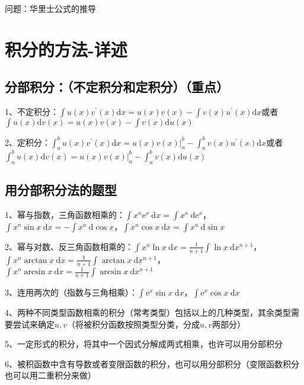 问题：华里士公式的推导

\section{积分的方法-详述}



\subsection{分部积分：（不定积分和定积分）（重点）}

1、不定积分：$\int u(x) v^{\prime}(x) \mathrm{d} x=u(x) v(x)-\int v(x) u^{\prime}(x) \mathrm{d} x$或者$\int u(x) \mathrm{d} v(x)=u(x) v(x)-\int v(x) \mathrm{d} u(x)$

2、定积分：$\int_{a}^{b} u(x) v^{\prime}(x) \mathrm{d} x=\left.u(x) v(x)\right|_{a} ^{b}-\int_{a}^{b} v(x) u^{\prime}(x) \mathrm{d} x$或者$\int_{a}^{b} u(x) \mathrm{d} v(x)=\left.u(x) v(x)\right|_{a} ^{b}-\int_{a}^{b} v(x) \mathrm{d} u(x)$



\subsection{用分部积分法的题型}

1、幂与指数，三角函数相乘的：$\int x^{n} \mathrm{e}^{x} \mathrm{~d} x=\int x^{n} \mathrm{~d} \mathrm{e}^{x}$，$\int x^{n} \sin x \mathrm{~d} x=-\int x^{n} \mathrm{~d} \cos x$，$\int x^{n} \cos x \mathrm{~d} x=\int x^{n} \mathrm{~d} \sin x$

2、幂与对数、反三角函数相乘的：$\int x^{n} \ln x \mathrm{~d} x=\frac{1}{n+1} \int \ln x \mathrm{~d} x^{n+1}$，$\int x^{n} \arctan x \mathrm{~d} x=\frac{1}{n+1} \int \arctan x \mathrm{~d} x^{n+1}$，$\int x^{n} \arcsin x \mathrm{~d} x=\frac{1}{n+1} \int \arcsin x \mathrm{~d} x^{n+1}$

3、连用两次的（指数与三角相乘）：$\int \mathrm{e}^{x} \sin x \mathrm{~d} x$，$\int \mathrm{e}^{x} \cos x \mathrm{~d} x$

4、两种不同类型函数相乘的积分（常考类型）包括以上的几种类型，其余类型需要尝试来确定$u,v$（将被积分函数按照类型分类，分成$u,v$两部分）

5、一定形式的积分，将其中一个因式分解成两式相乘，也许可以用分部积分

6、被积函数中含有导数或者变限函数的积分，也可以用分部积分（变限函数积分也可以用二重积分来做）



